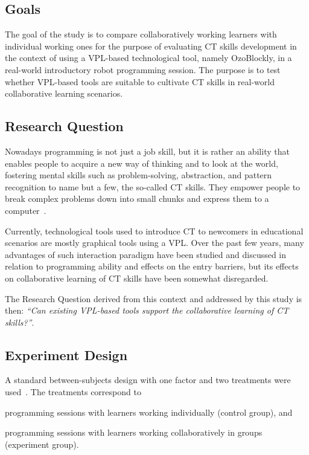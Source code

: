 \subsection{Goals}
The goal of the study is to compare collaboratively working learners with individual working ones for the purpose of evaluating \ac{CT} skills development in the context of using a \ac{VPL}-based technological tool, namely OzoBlockly, in a real-world introductory robot programming session. The purpose is to test whether \ac{VPL}-based tools are suitable to cultivate \ac{CT} skills in real-world collaborative learning scenarios.

\subsection{Research Question}
Nowadays programming is not just a job skill, but it is rather an ability that enables people to acquire a new way of thinking and to look at the world, fostering mental skills such as problem-solving, abstraction, and pattern recognition to name but a few, the so-called \ac{CT} skills. They empower people to break complex problems down into small chunks and express them to a computer~\cite{Vee:2013wc}.

Currently, technological tools used to introduce \ac{CT} to newcomers in educational scenarios are mostly graphical tools using a \ac{VPL}. Over the past few years, many advantages of such interaction paradigm have been studied and discussed in relation to programming ability and effects on the entry barriers, but its effects on collaborative learning of \ac{CT} skills have been somewhat disregarded.

The Research Question derived from this context and addressed by this study is then: \textit{``Can existing \ac{VPL}-based tools support the collaborative learning of \ac{CT} skills?''}.

\subsection{Experiment Design}
A standard between-subjects design with one factor and two treatments were used~\cite{Wohlin:2000:ESE:330775}. The treatments correspond to 
\begin{enumerate*}[label={(\roman*)}]
  \item programming sessions with learners working individually (control group), and
  \item programming sessions with learners working collaboratively in groups (experiment group).
\end{enumerate*}

